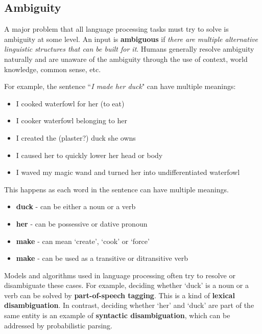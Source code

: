 \documentclass{sty/SizheArticle}
\begin{document}
\subsection{Ambiguity}
A major problem that all language processing tasks must try to solve is
ambiguity at some level. An input is \textbf{ambiguous} if \textit{there are
multiple alternative linguistic structures that can be built for it}.
Humans generally resolve ambiguity naturally and are unaware of the ambiguity
through the use of context, world knowledge, common sense, etc.

For example, the sentence ``\textit{I made her duck}" can have multiple meanings:
\begin{itemize}
\item I cooked waterfowl for her (to eat)
\item I cooker waterfowl belonging to her
\item I created the (plaster?) duck she owns
\item I caused her to quickly lower her head or body
\item I waved my magic wand and turned her into undifferentiated waterfowl
\end{itemize}
This happens as each word in the sentence can have multiple meanings.
\begin{itemize}
\item \textbf{duck} - can be either a noun or a verb
\item \textbf{her} - can be possessive or dative pronoun
\item \textbf{make} - can mean `create', `cook' or `force'
\item \textbf{make} - can be used as a transitive or ditransitive verb
\end{itemize}
Models and algorithms used in language processing often try to resolve or
disambiguate these cases. For example, deciding whether `duck' is a noun or a
verb can be solved by \textbf{part-of-speech tagging}. This is a kind of
\textbf{lexical disambiguation}. In contrast, deciding whether `her' and `duck'
are part of the same entity is an example of \textbf{syntactic disambiguation},
which can be addressed by probabilistic parsing.






\end{document}
